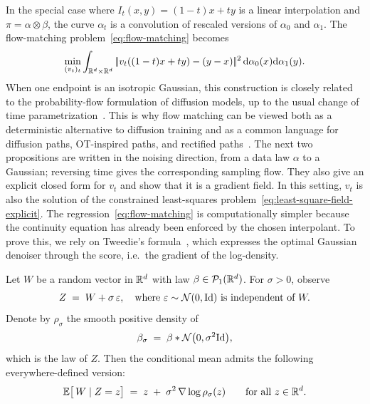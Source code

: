 In the special case where $I_t(x,y)=(1-t)x+ty$ is a linear interpolation and $\pi = \alpha \otimes \beta$, the curve $\alpha_t$ is a convolution of rescaled versions of $\alpha_0$ and $\alpha_1$. The flow-matching problem~\eqref{eq:flow-matching} becomes
\[
    \min_{(v_t)_t} \int_{\mathbb{R}^{d} \times \mathbb{R}^d} |\!| v_t( (1-t)x+t y ) - (y-x)  |\!|^2 \, \mathrm{d}\alpha_0(x) \mathrm{d}\alpha_1(y).
\]
When one endpoint is an isotropic Gaussian, this construction is closely related to the probability-flow formulation of diffusion models, up to the usual change of time parametrization~\cite{Song2021ScoreSDE}. This is why flow matching can be viewed both as a deterministic alternative to diffusion training and as a common language for diffusion paths, OT-inspired paths, and rectified paths~\cite{Lipman2022FlowMatching,Liu2023RectifiedFlow,Albergo2025StochasticInterpolants}. The next two propositions are written in the noising direction, from a data law $\alpha$ to a Gaussian; reversing time gives the corresponding sampling flow. They also give an explicit closed form for $v_t$ and show that it is a gradient field.
%
In this setting, $v_t$ is also the solution of the constrained least-squares problem~\eqref{eq:least-square-field-explicit}. The regression~\eqref{eq:flow-matching} is computationally simpler because the continuity equation has already been enforced by the chosen interpolant.
%
To prove this, we rely on Tweedie's formula~\cite{Efron2011Tweedie}, which expresses the optimal Gaussian denoiser through the score, i.e.\ the gradient of the log-density.

\begin{proposition}\label{prop:Tweedie}
Let $W$ be a random vector in $\mathbb{R}^{d}$ with law $\beta\in\mathcal{P}_1(\mathbb{R}^d)$.
For $\sigma>0$, observe
\[
Z \;=\; W + \sigma\,\varepsilon,
\quad\text{where } \varepsilon \sim \mathcal{N}(0,\mathrm{Id})
\text{ is independent of } W.
\]
Denote by $\rho_\sigma$ the smooth positive density of
\[
	\beta_\sigma \;=\; \beta * \mathcal{N}\bigl(0,\sigma^{2}\mathrm{Id}\bigr),
\]
which is the law of $Z$.
Then the conditional mean admits the following everywhere-defined version:
\[
\mathbb{E}\bigl[\,W \mid Z=z\bigr]
      \;=\; z \;+\;\sigma^{2}\,\nabla \log \rho_\sigma(z)
\qquad\text{for all } z \in \mathbb{R}^{d}.
\]
\end{proposition}

